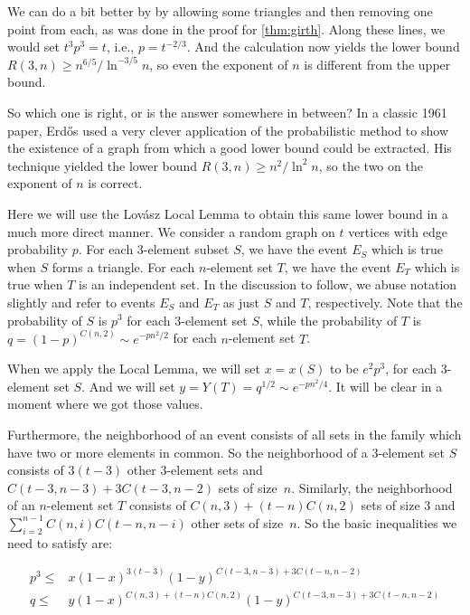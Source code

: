 We can do a bit better by by allowing some triangles and then removing
one point from each, as was done in the proof for
\autoref{thm:girth}. Along these lines, we would
set $t^3p^3=t$, i.e., $p=t^{-2/3}$.  And the calculation now
yields the lower bound $R(3,n)\ge n^{6/5}/\ln^{-3/5} n$, so even
the exponent of $n$ is different from the upper bound.

So which one is right, or is the answer somewhere in between?
In a classic 1961 paper, Erd\H{o}s used a very clever application
of the probabilistic method to show the existence of a graph from
which a good lower bound could be extracted.  His technique
yielded the lower bound $R(3,n)\ge n^2/\ln^2 n$, so the two
on the exponent of $n$ is correct.

Here we will use the Lov\'asz Local Lemma to obtain this
same lower bound in a much more direct manner.  We consider
a random graph on $t$ vertices with edge probability $p$.
For each $3$-element subset $S$, we have the event $E_S$ which is
true when $S$ forms a triangle.  For each $n$-element set $T$, we have
the event $E_T$ which is true when $T$ is an independent set.  In
the discussion to follow, we abuse notation slightly and refer to
events $E_S$ and $E_T$ as just $S$ and $T$, respectively.  Note
that the probability of $S$ is $p^3$ for each $3$-element
set $S$, while the probability of $T$ is $q=(1-p)^{C(n,2)}\sim
e^{-pn^2/2}$ for each $n$-element set $T$.  

When we apply the Local Lemma, we will set $x=x(S)$ to be $e^2p^3$,
for each $3$-element set $S$.  And we will set $y=Y(T)=q^{1/2}\sim
e^{-pn^2/4}$.  It will be clear in a moment where we got those values.

Furthermore, the neighborhood of an event consists of all sets
in the family which have two or more elements in common.
So the neighborhood of a $3$-element set $S$ consists of $3(t-3)$ 
other $3$-element sets and $C(t-3,n-3)+3C(t-3,n-2)$ sets of size~$n$.  
Similarly, the neighborhood of an $n$-element set $T$ consists of $C(n,3)+
(t-n)C(n,2)$ sets of size $3$ and $\sum_{i=2}^{n-1}C(n,i)
C(t-n,n-i)$ other sets of size~$n$.  So the basic inequalities
we need to satisfy are:

\begin{align*}
p^3 \le & x(1-x)^{3(t-3)}(1-y)^{C(t-3,n-3)+3C(t-n,n-2)}\\
q \le & y(1-x)^{C(n,3)+(t-n)C(n,2)}(1-y)^{C(t-3,n-3)+3C(t-n,n-2)}\\
\end{align*}

